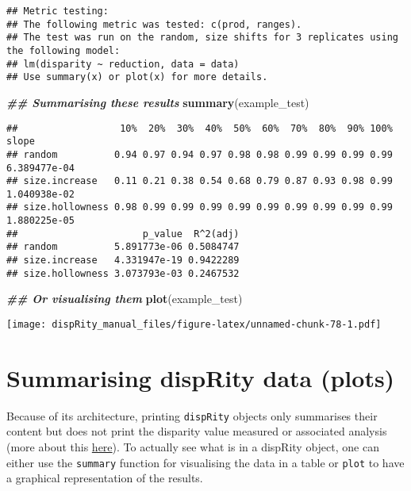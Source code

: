 \documentclass[
]{book}
\newenvironment{Shaded}{\begin{snugshade}}{\end{snugshade}}
\newcommand{\DocumentationTok}[1]{\textcolor[rgb]{0.56,0.35,0.01}{\textbf{\textit{#1}}}}
\newcommand{\FunctionTok}[1]{\textcolor[rgb]{0.13,0.29,0.53}{\textbf{#1}}}
\newcommand{\NormalTok}[1]{#1}
\begin{document}
\begin{verbatim}
## Metric testing:
## The following metric was tested: c(prod, ranges).
## The test was run on the random, size shifts for 3 replicates using the following model:
## lm(disparity ~ reduction, data = data)
## Use summary(x) or plot(x) for more details.
\end{verbatim}

\begin{Shaded}
\begin{Highlighting}[]
\DocumentationTok{\#\# Summarising these results}
\FunctionTok{summary}\NormalTok{(example\_test)}
\end{Highlighting}
\end{Shaded}

\begin{verbatim}
##                  10%  20%  30%  40%  50%  60%  70%  80%  90% 100%        slope
## random          0.94 0.97 0.94 0.97 0.98 0.98 0.99 0.99 0.99 0.99 6.389477e-04
## size.increase   0.11 0.21 0.38 0.54 0.68 0.79 0.87 0.93 0.98 0.99 1.040938e-02
## size.hollowness 0.98 0.99 0.99 0.99 0.99 0.99 0.99 0.99 0.99 0.99 1.880225e-05
##                      p_value  R^2(adj)
## random          5.891773e-06 0.5084747
## size.increase   4.331947e-19 0.9422289
## size.hollowness 3.073793e-03 0.2467532
\end{verbatim}

\begin{Shaded}
\begin{Highlighting}[]
\DocumentationTok{\#\# Or visualising them}
\FunctionTok{plot}\NormalTok{(example\_test)}
\end{Highlighting}
\end{Shaded}

\texttt{[image: dispRity\_manual\_files/figure-latex/unnamed-chunk-78-1.pdf]}

\hypertarget{summarising-disprity-data-plots}{%
\section{Summarising dispRity data (plots)}\label{summarising-disprity-data-plots}}

Because of its architecture, printing \texttt{dispRity} objects only summarises their content but does not print the disparity value measured or associated analysis (more about this \protect\hyperlink{manipulating-dispRity-objects}{here}).
To actually see what is in a dispRity object, one can either use the \texttt{summary} function for visualising the data in a table or \texttt{plot} to have a graphical representation of the results.
\end{document}
